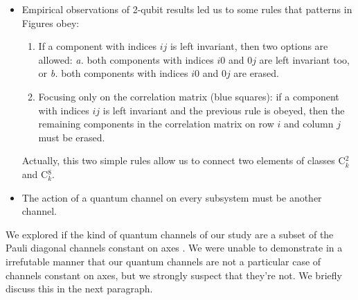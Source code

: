 \documentclass[11pt,dvipsnames]{article} %
\begin{document}
\begin{itemize}
\item Empirical observations of 2-qubit results led us to some rules that
patterns in Figures   obey:
\begin{enumerate}
\item If a component with indices $ij$ is left invariant, then two options are
allowed: \textit{a.} both components with indices $i0$ and $0j$ are left
invariant too, or \textit{b.} both components with indices $i0$ and $0j$ are
erased.
\item Focusing only on the correlation matrix (blue squares): if a component
with indices $ij$ is left invariant and the previous rule is obeyed, then the
remaining components in the correlation matrix on row $i$ and column $j$ must
be erased. 
\end{enumerate}	
Actually, this two simple rules allow us to connect two elements of classes
C${}^2_k$ and C${}^8_k$. 

\item The action of a quantum channel on every subsystem must be another
channel. 
\end{itemize}

We explored if the kind of quantum channels of our study are a subset 
of the Pauli diagonal channels constant on axes \cite{nathanson2007pauli}.
We were unable to demonstrate in a irrefutable manner that 
our quantum channels are not a particular case of channels constant on axes, 
but we strongly suspect that they're not. We briefly discuss this in the 
next paragraph. 
\end{document}
